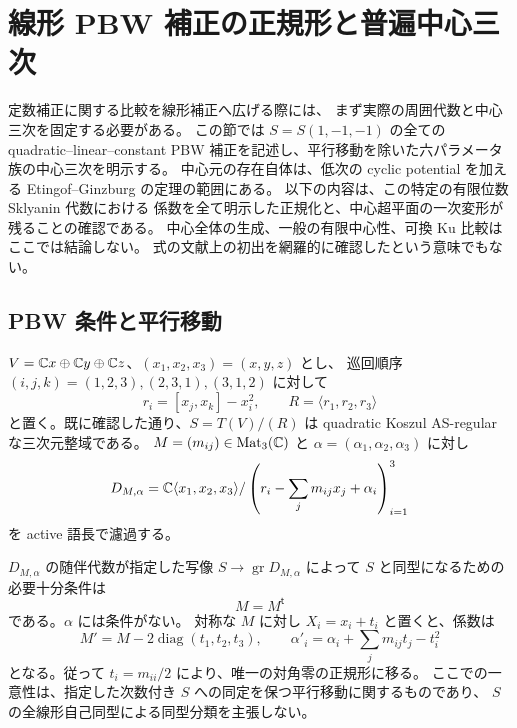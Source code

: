 \section{線形 PBW 補正の正規形と普遍中心三次}
\label{mix:sec:linear-pbw-boundary}

定数補正に関する比較を線形補正へ広げる際には、
まず実際の周囲代数と中心三次を固定する必要がある。
この節では $S=S(1,-1,-1)$ の全ての quadratic--linear--constant
PBW 補正を記述し、平行移動を除いた六パラメータ族の中心三次を明示する。
中心元の存在自体は、低次の cyclic potential を加える
Etingof--Ginzburg の定理\cite[Theorem~3.3.2]{NFMEG}の範囲にある。
以下の内容は、この特定の有限位数 Sklyanin 代数における
係数を全て明示した正規化と、中心超平面の一次変形が残ることの確認である。
中心全体の生成、一般の有限中心性、可換 Ku 比較はここでは結論しない。
式の文献上の初出を網羅的に確認したという意味でもない。

\subsection{PBW 条件と平行移動}

$V=\mathbb C x\oplus\mathbb C y\oplus\mathbb C z$、$(x_1,x_2,x_3)=(x,y,z)$ とし、
巡回順序 $(i,j,k)=(1,2,3),(2,3,1),(3,1,2)$ に対して
\[
 r_i=[x_j,x_k]-x_i^2,\qquad R=\langle r_1,r_2,r_3\rangle
\]
と置く。既に確認した通り、$S=T(V)/(R)$ は quadratic Koszul
AS-regular な三次元整域である。
$M=(m_{ij})\in\operatorname{Mat}_3(\mathbb C)$ と
$\alpha=(\alpha_1,\alpha_2,\alpha_3)$ に対し
\begin{equation}\label{mix:eq:linear-pbw-general}
 D_{M,\alpha}
 =\mathbb C\langle x_1,x_2,x_3\rangle/
       \left(r_i-\sum_jm_{ij}x_j+\alpha_i\right)_{i=1}^3
\end{equation}
を active 語長で濾過する。

\begin{proposition}
\label{mix:prop:linear-pbw-normal-form}
$D_{M,\alpha}$ の随伴代数が指定した写像 $S\to\operatorname{gr}D_{M,\alpha}$
によって $S$ と同型になるための必要十分条件は
\[
                         M=M^{\mathsf t}
\]
である。$\alpha$ には条件がない。
対称な $M$ に対し $X_i=x_i+t_i$ と置くと、係数は
\begin{equation}\label{mix:eq:linear-pbw-translation}
 M'=M-2\operatorname{diag}(t_1,t_2,t_3),\qquad
 \alpha'_i=\alpha_i+\sum_jm_{ij}t_j-t_i^2
\end{equation}
となる。従って $t_i=m_{ii}/2$ により、唯一の対角零の正規形に移る。
ここでの一意性は、指定した次数付き $S$ への同定を保つ平行移動に関するものであり、
$S$ の全線形自己同型による同型分類を主張しない。
\end{proposition}

